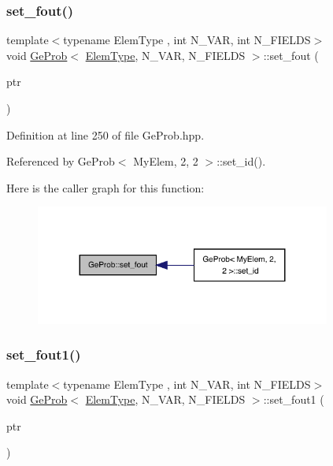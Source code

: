 \subsubsection{\texorpdfstring{set\+\_\+fout()}{set\_fout()}}
{\footnotesize\ttfamily template$<$typename Elem\+Type , int N\+\_\+\+V\+AR, int N\+\_\+\+F\+I\+E\+L\+DS$>$ \\
void \hyperlink{classGeProb}{Ge\+Prob}$<$ \hyperlink{spectral_8h_aaa2c1a7b2d1b12c590d730fe6ac839fa}{Elem\+Type}, N\+\_\+\+V\+AR, N\+\_\+\+F\+I\+E\+L\+DS $>$\+::set\+\_\+fout (\begin{DoxyParamCaption}\item[{F\+I\+LE $\ast$}]{ptr }\end{DoxyParamCaption})}



Definition at line 250 of file Ge\+Prob.\+hpp.



Referenced by Ge\+Prob$<$ My\+Elem, 2, 2 $>$\+::set\+\_\+id().

Here is the caller graph for this function\+:
\nopagebreak
\begin{figure}[H]
\begin{center}
\leavevmode
\includegraphics[width=275pt]{classGeProb_adba307125006b1f5e0bd9a04e05cecf2_icgraph}
\end{center}
\end{figure}
\mbox{\label{classGeProb_a75433e7f3aec6d8f0746cd3e0e82db96}} 
\subsubsection{\texorpdfstring{set\+\_\+fout1()}{set\_fout1()}}
{\footnotesize\ttfamily template$<$typename Elem\+Type , int N\+\_\+\+V\+AR, int N\+\_\+\+F\+I\+E\+L\+DS$>$ \\
void \hyperlink{classGeProb}{Ge\+Prob}$<$ \hyperlink{spectral_8h_aaa2c1a7b2d1b12c590d730fe6ac839fa}{Elem\+Type}, N\+\_\+\+V\+AR, N\+\_\+\+F\+I\+E\+L\+DS $>$\+::set\+\_\+fout1 (\begin{DoxyParamCaption}\item[{F\+I\+LE $\ast$}]{ptr }\end{DoxyParamCaption})}



